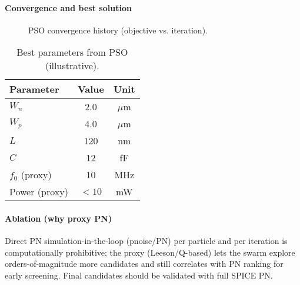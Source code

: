 \paragraph{Convergence and best solution}
\begin{figure}[H]
    \centering
    \caption{PSO convergence history (objective vs. iteration).}
    \label{fig:pso_convergence}
\end{figure}

\begin{table}[H]
    \centering
    \caption{Best parameters from PSO (illustrative).}
    \label{tab:pso_best_params}
    \begin{tabular}{lcc}
        \toprule
        Parameter & Value & Unit \\
        \midrule
        $W_n$ & 2.0 & $\mu$m \\
        $W_p$ & 4.0 & $\mu$m \\
        $L$   & 120 & nm \\
        $C$   & 12  & fF \\
        $f_0$ (proxy) & 10 & MHz \\
        Power (proxy) & $<10$ & mW \\
        \bottomrule
    \end{tabular}
\end{table}

\paragraph{Ablation (why proxy PN)}
Direct PN simulation-in-the-loop (pnoise/PN) per particle and per iteration is
computationally prohibitive; the proxy (Leeson/Q-based) lets the swarm explore
orders-of-magnitude more candidates and still correlates with PN ranking for
early screening. Final candidates should be validated with full SPICE PN.

